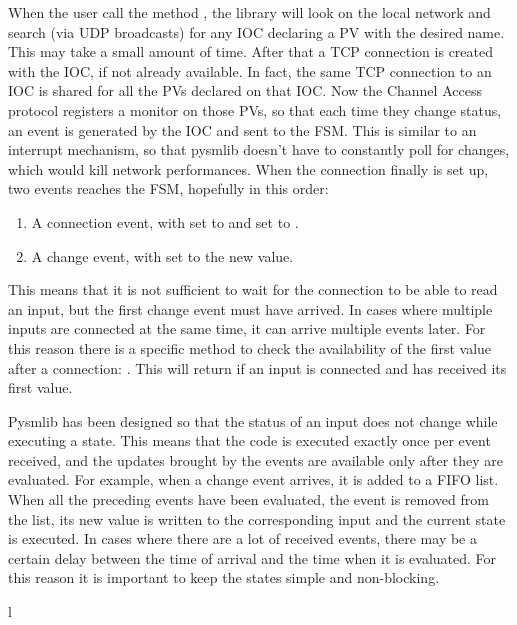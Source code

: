 \documentclass[letterpaper,10pt,english]{sphinxmanual}
\begin{document}
When the user call the method {\hyperref[\detokenize{fsm:connect}]{}}, the library will look on the
local network and search (via UDP broadcasts) for any IOC declaring a PV with
the desired name. This may take a small amount of time. After that a TCP
connection is created with the IOC, if not already available. In fact, the same
TCP connection to an IOC is shared for all the PVs declared on that IOC. Now the
Channel Access protocol registers a monitor on those PVs, so that each time they
change status, an event is generated by the IOC and sent to the FSM. This is
similar to an interrupt mechanism, so that pysmlib doesn’t have to constantly
poll for changes, which would kill network performances. When the connection
finally is set up, two events reaches the FSM, hopefully in this order:
\begin{enumerate}
\item {} 
A connection event, with  set to  and  set    to .

\item {} 
A change event, with  set to the new value.

\end{enumerate}

This means that it is not sufficient to wait for the connection to be able to
read an input, but the first change event must have arrived. In cases where
multiple inputs are connected at the same time, it can arrive multiple events
later. For this reason there is a specific method to check the availability
of the first value after a connection: {\hyperref[\detokenize{io:initialized}]{}}. This will return
 if an input is connected and has received its first value.

Pysmlib has been designed so that the status of an input does not change while
executing a state. This means that the code is executed exactly once per event
received, and the updates brought by the events are available only after they
are evaluated. For example, when a change event arrives, it is added to a FIFO
list. When all the preceding events have been evaluated, the event is removed
from the list, its new value is written to the corresponding input and the
current state is executed. In cases where there are a lot of received events,
there may be a certain delay between the time of arrival and the time when it is
evaluated. For this reason it is important to keep the states simple and non-blocking.


\renewcommand{\indexname}{Python Module Index}
\begin{sphinxtheindex}
\def\bigletter#1{{\Large\sffamily#1}\nopagebreak\vspace{1mm}}
\bigletter{l}
\item {}
\end{sphinxtheindex}

\renewcommand{\indexname}{Index}
\printindex
\end{document}
